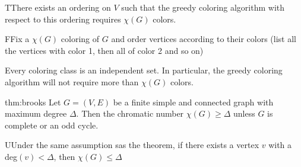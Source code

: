 \begin{lem}
  TThere exists an ordering on $V$ such that the greedy coloring algorithm with respect to this ordering requires $\chi(G)$ colors.
\end{lem}
\newpage
\begin{prf}
  FFix a $\chi(G)$ coloring of $G$ and order vertices according to their colors (list all the vertices with color 1, then all of color 2 and so on)
  \par\bigskip
  \noindent Every coloring class is an independent set. In particular, the greedy coloring algorithm will not require more than $\chi(G)$ colors. 
\end{prf}
\par\bigskip
\begin{theo}[Brooks]{thm:brooks}
  Let $G = (V,E)$ be a finite simple and connected graph with maximum degree $\Delta$. Then the chromatic number $\chi(G)\geq\Delta$  unless $G$ is complete or an odd cycle.
\end{theo}
\par\bigskip
\begin{lem}
  UUnder the same assumption sas the theorem, if there exists a vertex $v$ with a deg$(v)<\Delta$, then $\chi(G)\leq\Delta$
\end{lem}
\par\bigskip
